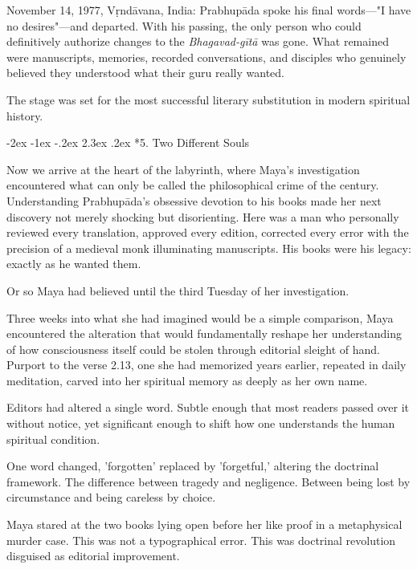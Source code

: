 \documentclass[12pt,twoside]{book}
\makeatletter
\renewcommand\section{\@startsection{section}{1}{\z@}%
{-3.5ex \@plus -1ex \@minus -.2ex}%
{2.3ex \@plus.2ex}%
{\normalfont\Large\bfseries}}
\let\oldsection\section
\renewcommand{\section}[1]{\needspace{4\baselineskip}\oldsection{#1}}
\def\cleardoublepage{\clearpage\if@twoside \ifodd\c@page\else\hbox{}\thispagestyle{empty}\newpage\if@twocolumn\hbox{}\newpage\fi\fi\fi}
\renewcommand\section{\@startsection{section}{1}{\z@}%
{-2ex \@plus -1ex \@minus -.2ex}%
{2.3ex \@plus.2ex}%
{\normalfont\Large\bfseries}}
\makeatother
\begin{document}
November 14, 1977, Vṛndāvana, India: Prabhupāda spoke his final words—"I have no desires"—and departed. With his passing, the only person who could definitively authorize changes to the \emph{Bhagavad-gītā} was gone. What remained were manuscripts, memories, recorded conversations, and disciples who genuinely believed they understood what their guru really wanted.

The stage was set for the most successful literary substitution in modern spiritual history.

\cleardoublepage
\vspace*{0.20\textheight}
\section*{5. Two Different Souls}
\thispagestyle{chapterpage}

\normalfont\justifying
Now we arrive at the heart of the labyrinth, where Maya's investigation encountered what can only be called the philosophical crime of the century. Understanding Prabhupāda's obsessive devotion to his books made her next discovery not merely shocking but disorienting. Here was a man who personally reviewed every translation, approved every edition, corrected every error with the precision of a medieval monk illuminating manuscripts. His books were his legacy: exactly as he wanted them.

Or so Maya had believed until the third Tuesday of her investigation.

Three weeks into what she had imagined would be a simple comparison, Maya encountered the alteration that would fundamentally reshape her understanding of how consciousness itself could be stolen through editorial sleight of hand. Purport to the verse 2.13, one she had memorized years earlier, repeated in daily meditation, carved into her spiritual memory as deeply as her own name.

Editors had altered a single word. Subtle enough that most readers passed over it without notice, yet significant enough to shift how one understands the human spiritual condition.

One word changed, 'forgotten' replaced by 'forgetful,' altering the doctrinal framework. The difference between tragedy and negligence. Between being lost by circumstance and being careless by choice.

Maya stared at the two books lying open before her like proof in a metaphysical murder case. This was not a typographical error. This was doctrinal revolution disguised as editorial improvement.
\end{document}
